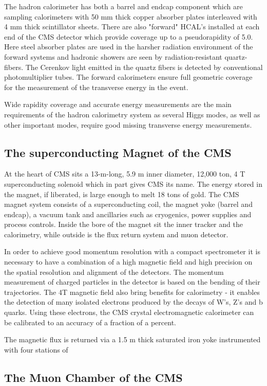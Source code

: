 The hadron calorimeter has both a barrel and endcap component which are sampling calorimeters with 50 mm thick copper absorber plates interleaved with 4 mm thick scintillator sheets. 
There are also "forward" HCAL's installed at each end of the CMS detector which provide coverage up to a pseudorapidity of 5.0. 
Here steel absorber plates are used in the harsher radiation environment of the forward systems and hadronic showers are seen by radiation-resistant quartz-fibers. 
The Cerenkov light emitted in the quartz fibers is detected by conventional photomultiplier tubes. 
The forward calorimeters ensure full geometric coverage for the measurement of the transverse energy in the event.

Wide rapidity coverage and accurate energy measurements are the main requirements of the hadron calorimetry system as several Higgs modes, as well as other important modes, require good missing transverse energy measurements.
\subsection{The superconducting Magnet  of the CMS}

At the heart of CMS sits a 13-m-long, 5.9 m inner diameter, 12,000 ton, 4 T superconducting solenoid which in part gives CMS its name. 
The energy stored in the magnet, if liberated, is large enough to melt 18 tons of gold. 
The CMS magnet system consists of a superconducting coil, the magnet yoke (barrel and endcap), a vacuum tank and ancillaries such as cryogenics, power supplies and process controls. 
Inside the bore of the magnet sit the inner tracker and the calorimetry, while outside is the flux return system and muon detector.

In order to achieve good momentum resolution with a compact spectrometer it is necessary to have a combination of a high magnetic field and high precision on the spatial resolution and alignment of the detectors. 
The momentum measurement of charged particles in the detector is based on the bending of their trajectories. 
The 4T magnetic field also bring benefits for calorimetry - it enables the detection of many isolated electrons produced by the decays of W's, Z's and b quarks. 
Using these electrons, the CMS crystal electromagnetic calorimeter can be calibrated to an accuracy of a fraction of a percent.

The magnetic flux is returned via a 1.5 m thick saturated iron yoke instrumented with four stations of


\subsection{The Muon Chamber of the CMS}


